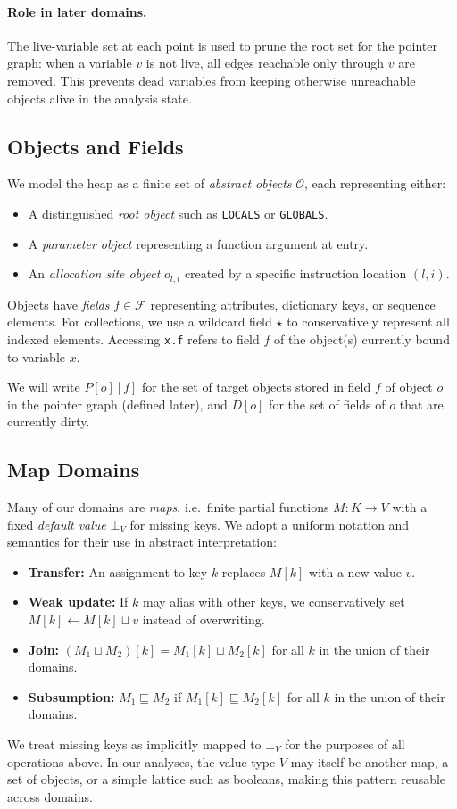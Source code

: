 \paragraph{Role in later domains.}
The live-variable set at each point is used to prune the root set for the pointer graph: when a variable $v$ is not live, all edges reachable only through $v$ are removed.
This prevents dead variables from keeping otherwise unreachable objects alive in the analysis state.

\subsection{Objects and Fields}
We model the heap as a finite set of \emph{abstract objects} $\mathcal{O}$, each representing either:
\begin{itemize}
    \item A distinguished \emph{root object} such as \texttt{LOCALS} or \texttt{GLOBALS}.
    \item A \emph{parameter object} representing a function argument at entry.
    \item An \emph{allocation site object} $o_{l,i}$ created by a specific instruction location $(l, i)$.
\end{itemize}
Objects have \emph{fields} $f \in \mathcal{F}$ representing attributes, dictionary keys, or sequence elements.
For collections, we use a wildcard field $\star$ to conservatively represent all indexed elements.
Accessing \texttt{x.f} refers to field $f$ of the object(s) currently bound to variable $x$.

We will write $P[o][f]$ for the set of target objects stored in field $f$ of object $o$ in the pointer graph (defined later), and $D[o]$ for the set of fields of $o$ that are currently dirty.

\subsection{Map Domains}
Many of our domains are \emph{maps}, i.e.\ finite partial functions $M : K \to V$ with a fixed \emph{default value} $\bot_V$ for missing keys.
We adopt a uniform notation and semantics for their use in abstract interpretation:
\begin{itemize}
    \item \textbf{Transfer:} An assignment to key $k$ replaces $M[k]$ with a new value $v$.
    \item \textbf{Weak update:} If $k$ may alias with other keys, we conservatively set $M[k] \leftarrow M[k] \sqcup v$ instead of overwriting.
    \item \textbf{Join:} $(M_1 \sqcup M_2)[k] = M_1[k] \sqcup M_2[k]$ for all $k$ in the union of their domains.
    \item \textbf{Subsumption:} $M_1 \sqsubseteq M_2$ if $M_1[k] \sqsubseteq M_2[k]$ for all $k$ in the union of their domains.
\end{itemize}
We treat missing keys as implicitly mapped to $\bot_V$ for the purposes of all operations above.
In our analyses, the value type $V$ may itself be another map, a set of objects, or a simple lattice such as booleans, making this pattern reusable across domains.

